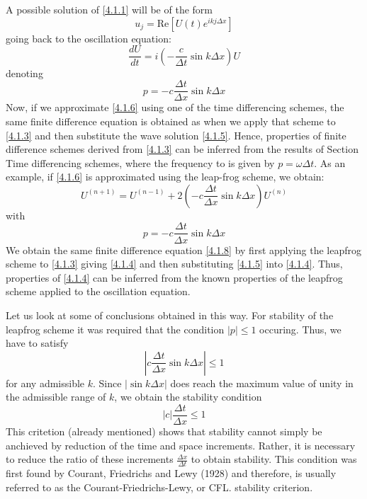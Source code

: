 A possible solution of \ref{4.1.1} will be of the form 
\begin{equation}\label{4.1.5}
    u_j=\text{Re}\left[U(t)e^{ikj\Delta x}\right]
\end{equation}
going back to the oscillation equation:
\begin{equation}\label{4.1.6}
    \frac{dU}{dt}=i\left(-\frac{c}{\Delta t}\sin k\Delta x\right)U
\end{equation}
denoting 
$$p=-c\frac{\Delta t}{\Delta x}\sin k\Delta x$$
Now, if we approximate \ref{4.1.6} using one of the time differencing schemes, the same finite difference equation is obtained as when we apply that scheme to \ref{4.1.3} and then substitute the wave solution \ref{4.1.5}. Hence, properties of finite difference schemes derived from \ref{4.1.3} can be inferred from the results of Section Time differencing schemes, where the frequency to is given by $p=\omega\Delta t$.
As an example, if \ref{4.1.6} is approximated using the leap-frog scheme, we obtain:
\begin{equation}\label{4.1.8}
    U^{(n+1)}=U^{(n-1)}+2\left(-c\frac{\Delta t}{\Delta x}\sin k\Delta x\right)U^{(n)}
\end{equation}
with 
\begin{equation}\label{4.1.9}
    p=-c\frac{\Delta t}{\Delta x}\sin k\Delta x
\end{equation}
We obtain the same finite difference equation \ref{4.1.8} by first applying the leapfrog scheme to \ref{4.1.3} giving \ref{4.1.4} and then substituting \ref{4.1.5} into \ref{4.1.4}. Thus, properties of \ref{4.1.4} can be inferred from the known properties of the leapfrog scheme applied to the oscillation equation.

Let us look at some of conclusions obtained in this way. For stability of the leapfrog scheme it was required that the condition $|p|\leq 1$ occuring. Thus, we have to satisfy
\begin{equation}
    \left|c\frac{\Delta t}{\Delta x}\sin k\Delta x\right|\leq 1
\end{equation}
for any admissible $k$. Since $|\sin k\Delta x|$ does reach the maximum value of unity in the admissible range of $k$, we obtain the stability condition 
\begin{equation}\label{4.1.10}
    |c|\frac{\Delta t}{\Delta x}\leq 1
\end{equation}
This critetion (already mentioned) shows that stability cannot simply be anchieved by reduction of the time and space increments. Rather, it is necessary to reduce the ratio of these increments $\frac{\Delta x}{\Delta t}$ to obtain stability. This condition was first found by Courant, Friedrichs and Lewy (1928) and therefore, is usually referred to as the Courant-Friedrichs-Lewy, or CFL. stability criterion.

